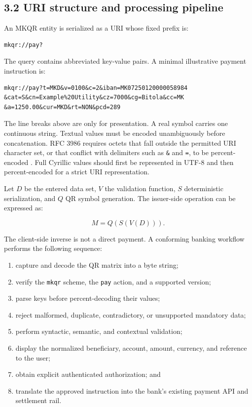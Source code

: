 \subsection{3.2 URI structure and processing pipeline}

An MKQR entity is serialized as a URI whose fixed prefix is:

\begin{verbatim}
mkqr://pay?
\end{verbatim}

The query contains abbreviated key-value pairs. A minimal illustrative payment instruction is:

\begin{verbatim}
mkqr://pay?t=MKD&v=0100&c=2&iban=MK07250120000058984
&cat=S&cn=Example%20Utility&cz=7000&cg=Bitola&cc=MK
&a=1250.00&cur=MKD&rt=NON&pcd=289
\end{verbatim}

The line breaks above are only for presentation. A real symbol carries one continuous string. Textual values must be encoded unambiguously before concatenation. RFC 3986 requires octets that fall outside the permitted URI character set, or that conflict with delimiters such as \texttt{\&} and \texttt{=}, to be percent-encoded \cite{rfc3986}. Full Cyrillic values should first be represented in UTF-8 and then percent-encoded for a strict URI representation.

Let \(D\) be the entered data set, \(V\) the validation function, \(S\) deterministic serialization, and \(Q\) QR symbol generation. The issuer-side operation can be expressed as:

\begin{equation}
M = Q(S(V(D))).
\end{equation}

The client-side inverse is not a direct payment. A conforming banking workflow performs the following sequence:

\begin{enumerate}
\item capture and decode the QR matrix into a byte string;
\item verify the \texttt{mkqr} scheme, the \texttt{pay} action, and a supported version;
\item parse keys before percent-decoding their values;
\item reject malformed, duplicate, contradictory, or unsupported mandatory data;
\item perform syntactic, semantic, and contextual validation;
\item display the normalized beneficiary, account, amount, currency, and reference to the user;
\item obtain explicit authenticated authorization; and
\item translate the approved instruction into the bank's existing payment API and settlement rail.
\end{enumerate}

